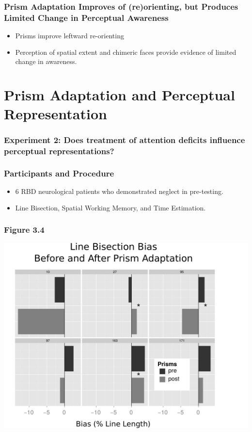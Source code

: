 \documentclass{beamer}
\begin{document}
\begin{frame}
	\frametitle{Prism Adaptation Improves of (re)orienting, but Produces Limited Change in Perceptual Awareness}
	\begin{itemize}
		\item Prisms improve leftward re-orienting
		\item Perception of spatial extent and chimeric faces provide evidence of limited change in awareness.
	\end{itemize}
\end{frame}

\section[Prisms]{Prism Adaptation and Perceptual Representation}

\begin{frame}
	\frametitle{Experiment 2: Does treatment of attention deficits influence perceptual representations?}
		\tableofcontents[currentsection]
\end{frame}


\begin{frame}
	\frametitle{Participants and Procedure}
\begin{itemize}
	\item 6 RBD neurological patients who demonstrated neglect in pre-testing.
	\item Line Bisection, Spatial Working Memory, and Time Estimation.
\end{itemize}
\end{frame}

\end{document}
